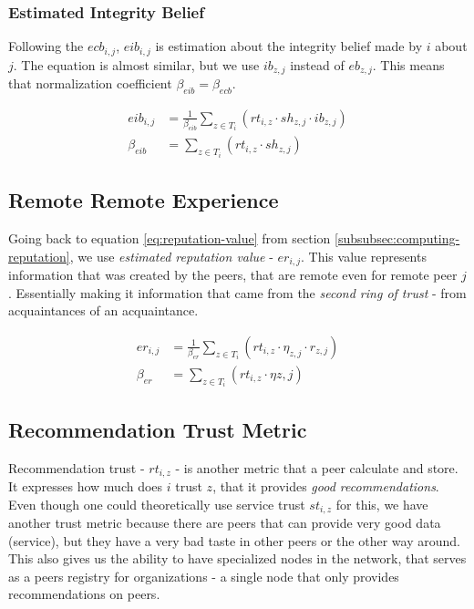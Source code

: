 \subsubsection{Estimated Integrity Belief}
Following the $ecb_{i,j}$, $eib_{i,j}$ is estimation about the integrity belief made by $i$ about $j$.
The equation is almost similar, but we use $ib_{z,j}$ instead of $eb_{z,j}$.
This means that normalization coefficient $\beta_{eib} = \beta_{ecb}$.

\begin{equation}
\label{eq:estimated-integrity-belief}
\begin{split}
    eib_{i,j} &= \frac{1}{\beta_{eib}} \sum_{z \in T_{i}} \left(rt_{i, z} \cdot sh_{z, j} \cdot ib_{z, j}\right) \\
    \beta_{eib} &= \sum_{z \in T_{i}} \left(rt_{i, z} \cdot sh_{z, j}\right)
\end{split}
\end{equation}

\subsection{Remote Remote Experience}
Going back to equation \ref{eq:reputation-value} from section \ref{subsubsec:computing-reputation}, we use \textit{estimated reputation value} - $er_{i,j}$.
This value represents information that was created by the peers, that are remote even for remote peer $j$. 
Essentially making it information that came from the \textit{second ring of trust} - from acquaintances of an acquaintance.

\begin{equation}
\label{eq:estimated-reputation}
\begin{split}
    er_{i,j} &= \frac{1}{\beta_{er}} \sum_{z \in T_{i}} \left(rt_{i, z} \cdot \eta_{z, j} \cdot r_{z, j}\right) \\
    \beta_{er} &= \sum_{z \in T_{i}} \left(rt_{i, z} \cdot \eta{z, j}\right)
\end{split}
\end{equation}

\subsection{Recommendation Trust Metric}
\label{subsec:recommendation-trust-metric}
Recommendation trust - $rt_{i,z}$ - is another metric that a peer calculate and store. It expresses how much does $i$ trust $z$, that it provides \textit{good recommendations}.
Even though one could theoretically use service trust $st_{i, z}$ for this,
we have another trust metric because there are peers that can provide very good data (service), but they have a very bad taste in other peers or the other way around.
This also gives us the ability to have specialized nodes in the network, that serves as a peers registry for organizations - a single node that only provides recommendations on peers.

